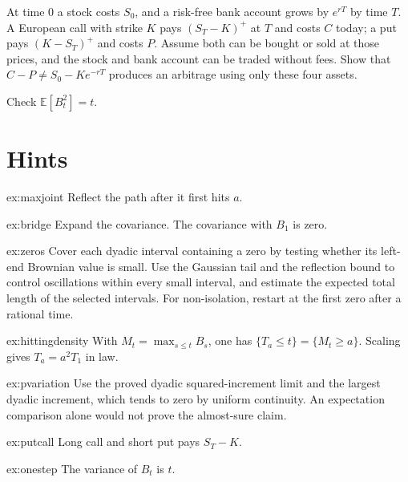 \begin{exercise}[$\star$]\label{ex:putcall}
At time $0$ a stock costs $S_0$, and a risk-free bank account grows by $e^{rT}$ by time $T$. A European call with strike $K$ pays $(S_T-K)^+$ at $T$ and costs $C$ today; a put pays $(K-S_T)^+$ and costs $P$. Assume both can be bought or sold at those prices, and the stock and bank account can be traded without fees. Show that $C-P\ne S_0-Ke^{-rT}$ produces an arbitrage using only these four assets.
\end{exercise}

\begin{exercise}[$\star$]\label{ex:onestep}
Check $\mathbb E[B_t^2]=t$.
\end{exercise}

\section{Hints}

\begin{hint}{ex:maxjoint}
Reflect the path after it first hits $a$.
\end{hint}
\begin{hint}{ex:bridge}
Expand the covariance. The covariance with $B_1$ is zero.
\end{hint}
\begin{hint}{ex:zeros}
Cover each dyadic interval containing a zero by testing whether its left-end Brownian value is small. Use the Gaussian tail and the reflection bound to control oscillations within every small interval, and estimate the expected total length of the selected intervals. For non-isolation, restart at the first zero after a rational time.
\end{hint}
\begin{hint}{ex:hittingdensity}
With $M_t=\max_{s\le t}B_s$, one has $\{T_a\le t\}=\{M_t\ge a\}$. Scaling gives $T_a=a^2 T_1$ in law.
\end{hint}
\begin{hint}{ex:pvariation}
Use the proved dyadic squared-increment limit and the largest dyadic increment, which tends to zero by uniform continuity. An expectation comparison alone would not prove the almost-sure claim.
\end{hint}
\begin{hint}{ex:putcall}
Long call and short put pays $S_T-K$.
\end{hint}
\begin{hint}{ex:onestep}
The variance of $B_t$ is $t$.
\end{hint}


